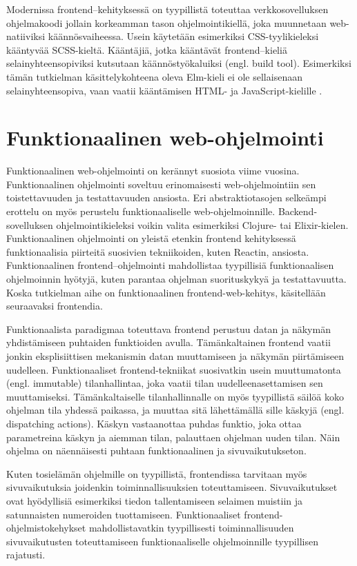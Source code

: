 Modernissa frontend–kehityksessä on tyypillistä toteuttaa verkkosovelluksen ohjelmakoodi jollain korkeamman tason
ohjelmointikiellä, joka muunnetaan web-natiiviksi käännösvaiheessa. Usein käytetään esimerkiksi CSS-tyylikieleksi
kääntyvää SCSS-kieltä. Kääntäjiä, jotka kääntävät frontend–kieliä selainyhteensopiviksi kutsutaan käännöstyökaluiksi
(engl. build tool). Esimerkiksi tämän tutkielman käsittelykohteena oleva Elm-kieli ei ole sellaisenaan
selainyhteensopiva, vaan vaatii kääntämisen HTML- ja JavaScript-kielille \cite{elmlang}. \cite{fullstackdeveloper}

\section{Funktionaalinen web-ohjelmointi}
Funktionaalinen web-ohjelmointi on kerännyt suosiota viime vuosina. Funktionaalinen ohjelmointi soveltuu erinomaisesti
web-ohjelmointiin sen toistettavuuden ja testattavuuden ansiosta. Eri abstraktiotasojen selkeämpi erottelu on myös
perustelu funktionaaliselle web-ohjelmoinnille. Backend-sovelluksen ohjelmointikieleksi voikin valita esimerkiksi
Clojure- tai Elixir-kielen. \cite{functionalwebdev} Funktionaalinen ohjelmointi on yleistä etenkin frontend kehityksessä
funktionaalisia piirteitä suosivien tekniikoiden, kuten Reactin, ansiosta. Funktionaalinen frontend–ohjelmointi
mahdollistaa tyypillisiä funktionaalisen ohjelmoinnin hyötyjä, kuten parantaa ohjelman suorituskykyä ja testattavuutta.
\cite{functionalreact} Koska tutkielman aihe on funktionaalinen frontend-web-kehitys, käsitellään seuraavaksi
frontendia.

Funktionaalista paradigmaa toteuttava frontend perustuu datan ja näkymän yhdistämiseen puhtaiden funktioiden avulla.
Tämänkaltainen frontend vaatii jonkin eksplisiittisen mekanismin datan muuttamiseen ja näkymän piirtämiseen uudelleen.
Funktionaaliset frontend-tekniikat suosivatkin usein muuttumatonta (engl. immutable) tilanhallintaa, joka vaatii tilan
uudelleenasettamisen sen muuttamiseksi. Tämänkaltaiselle tilanhallinnalle on myös tyypillistä säilöä koko ohjelman tila
yhdessä paikassa, ja muuttaa sitä lähettämällä sille käskyjä (engl. dispatching actions). Käskyn vastaanottaa puhdas
funktio, joka ottaa parametreina käskyn ja aiemman tilan, palauttaen ohjelman uuden tilan. Näin ohjelma on näennäisesti
puhtaan funktionaalinen ja sivuvaikutukseton. \cite{functionalreact}

Kuten tosielämän ohjelmille on tyypillistä, frontendissa tarvitaan myös sivuvaikutuksia joidenkin toiminnallisuuksien
toteuttamiseen. Sivuvaikutukset ovat hyödyllisiä esimerkiksi tiedon tallentamiseen selaimen muistiin ja satunnaisten
numeroiden tuottamiseen. Funktionaaliset frontend-ohjelmistokehykset mahdollistavatkin tyypillisesti toiminnallisuuden
sivuvaikutusten toteuttamiseen funktionaaliselle ohjelmoinnille tyypillisen rajatusti. \cite{elmlang}\cite{reactjs}


